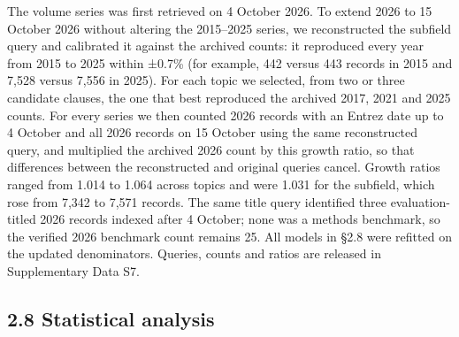 \documentclass[11pt]{article}
\begin{document}
The volume series was first retrieved on 4 October 2026. To extend 2026
to 15 October 2026 without altering the 2015--2025 series, we
reconstructed the subfield query and calibrated it against the archived
counts: it reproduced every year from 2015 to 2025 within ±0.7\% (for
example, 442 versus 443 records in 2015 and 7,528 versus 7,556 in 2025).
For each topic we selected, from two or three candidate clauses, the one
that best reproduced the archived 2017, 2021 and 2025 counts. For every
series we then counted 2026 records with an Entrez date up to 4 October
and all 2026 records on 15 October using the same reconstructed query,
and multiplied the archived 2026 count by this growth ratio, so that
differences between the reconstructed and original queries cancel.
Growth ratios ranged from 1.014 to 1.064 across topics and were 1.031
for the subfield, which rose from 7,342 to 7,571 records. The same title
query identified three evaluation-titled 2026 records indexed after 4
October; none was a methods benchmark, so the verified 2026 benchmark
count remains 25. All models in §2.8 were refitted on the updated
denominators. Queries, counts and ratios are released in Supplementary
Data S7.

\subsection{2.8 Statistical analysis}\label{statistical-analysis}
\end{document}
